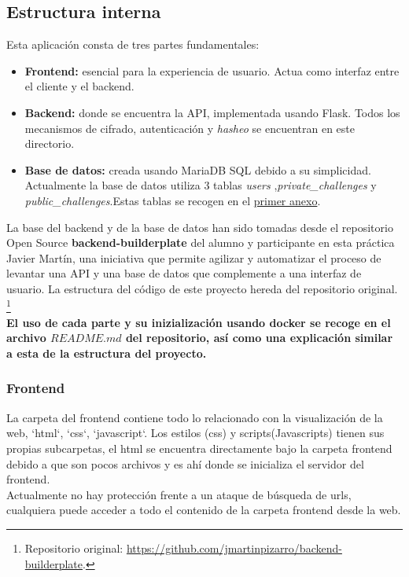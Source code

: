 \documentclass[a4paper,11pt]{article}
\begin{document}
\subsection{Estructura interna}

Esta aplicación consta de tres partes fundamentales:
\begin{itemize}
    \item \textbf{Frontend:} esencial para la experiencia de usuario. Actua como interfaz entre el cliente y el backend.
    \item \textbf{Backend:} donde se encuentra la API, implementada usando
        Flask. Todos los mecanismos de cifrado, autenticación y \textit{hasheo} se encuentran en este directorio.
    \item \textbf{Base de datos:} creada usando MariaDB SQL debido a su
        simplicidad. Actualmente la base de datos utiliza 3 tablas
        \textit{users} ,\textit{private\_challenges} y
        \textit{public\_challenges}.Estas tablas se recogen en el
        \hyperref[sec:TablasSQL]{primer anexo}.  
\end{itemize}
La base del backend y de la base de datos han sido tomadas desde el repositorio
Open Source \textbf{backend-builderplate} del alumno y participante en esta
práctica Javier Martín, una iniciativa que permite agilizar y automatizar el
proceso de levantar una API y una base de datos que complemente a una interfaz
de usuario. La estructura del código de este proyecto hereda del repositorio original.%
\footnote{Repositorio original:
\url{https://github.com/jmartinpizarro/backend-builderplate}.}\\

\textbf{El uso de cada parte y su inizialización usando docker se recoge en el
archivo $README.md$ del repositorio, así como una explicación similar a esta de
la estructura del proyecto.}\\

\subsubsection{Frontend}
La carpeta del frontend contiene todo lo relacionado con la visualización de la
web, `html`, `css`, `javascript`. Los estilos (css) y scripts(Javascripts)
tienen sus propias subcarpetas, el html se encuentra directamente bajo la
carpeta frontend debido a que son pocos archivos y es ahí donde se inicializa el
servidor del frontend. \\

Actualmente no hay protección frente a un ataque de búsqueda de urls, cualquiera puede acceder a todo el contenido de la carpeta frontend desde la web.
\end{document}

